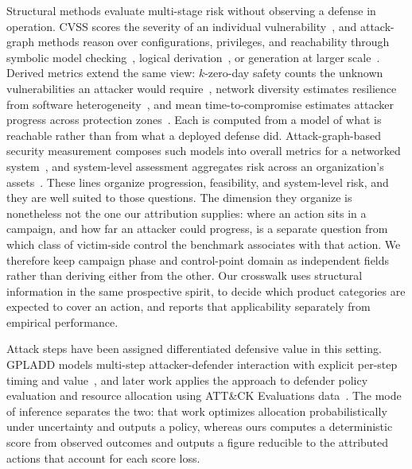 Structural methods evaluate multi-stage risk without observing a defense in operation. CVSS scores the severity of an individual vulnerability~\cite{mell2007common,first2019cvss31}, and attack-graph methods reason over configurations, privileges, and reachability through symbolic model checking~\cite{sheyner2002attackgraphs}, logical derivation~\cite{ou2005mulval}, or generation at larger scale~\cite{ou2006scalable}. Derived metrics extend the same view: $k$-zero-day safety counts the unknown vulnerabilities an attacker would require~\cite{wang2014kzero}, network diversity estimates resilience from software heterogeneity~\cite{zhang2016networkdiversity}, and mean time-to-compromise estimates attacker progress across protection zones~\cite{leversage2008mttc}. Each is computed from a model of what is reachable rather than from what a deployed defense did. Attack-graph-based security measurement composes such models into overall metrics for a networked system~\cite{wang2007measuring}, and system-level assessment aggregates risk across an organization's assets~\cite{erola2022system}. These lines organize progression, feasibility, and system-level risk, and they are well suited to those questions. The dimension they organize is nonetheless not the one our attribution supplies: where an action sits in a campaign, and how far an attacker could progress, is a separate question from which class of victim-side control the benchmark associates with that action. We therefore keep campaign phase and control-point domain as independent fields rather than deriving either from the other. Our crosswalk uses structural information in the same prospective spirit, to decide which product categories are expected to cover an action, and reports that applicability separately from empirical performance.

Attack steps have been assigned differentiated defensive value in this setting. GPLADD models multi-step attacker-defender interaction with explicit per-step timing and value~\cite{outkin2019gpladd}, and later work applies the approach to defender policy evaluation and resource allocation using ATT\&CK Evaluations data~\cite{outkin2022defender}. The mode of inference separates the two: that work optimizes allocation probabilistically under uncertainty and outputs a policy, whereas ours computes a deterministic score from observed outcomes and outputs a figure reducible to the attributed actions that account for each score loss.

